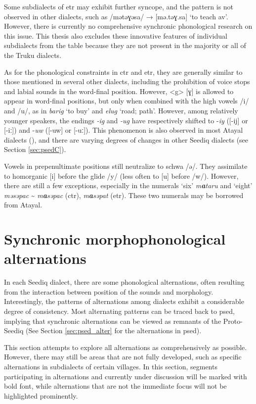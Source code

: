 Some subdialects of \acl{etr} may exhibit further syncope, and the pattern is not observed in other dialects, such as /mətəɣəsa/ → [mə.təɣ.sa] `to teach \acs{av}'. However, there is currently no comprehensive synchronic phonological research on this issue. This thesis also excludes these innovative features of individual subdialects from the table because they are not present in the majority or all of the Truku dialects.

As for the phonological constraints in \acl{ctr} and \acl{etr}, they are generally similar to those mentioned in several other dialects, including the prohibition of voice stops and labial sounds in the word-final position. However, <g> [ɣ] is allowed to appear in word-final positions, but only when combined with the high vowels /i/ and /u/, as in \textit{barig} `to buy' and \textit{elug} `road; path'. However, among relatively younger speakers, the endings \textit{-ig} and \textit{-ug} have respectively shifted to -\textit{iy} ([-ij] or [-iː]) and -\textit{uw} ([-uw] or [-uː]). This phenomenon is also observed in most Atayal dialects (\cite{li1982aicage,goderich2020phd}), and there are varying degrees of changes in other Seediq dialects (see Section \ref{sec:psedC}).

Vowels in prepenultimate positions still neutralize to schwa /ə/. They assimilate to homorganic [i] before the glide /y/ (less often to [u] before /w/). However, there are still a few exceptions, especially in the numerals `six' \textit{m\textbf{a}taru} and `eight' \textit{məsəpac} \~{} \textit{m\textbf{a}səpac} (\acs{ctr}), \textit{m\textbf{a}səpat} (\acs{etr}). These two numerals may be borrowed from Atayal.

\section{Synchronic morphophonological alternations} \label{sec:3.2}

In each Seediq dialect, there are some phonological alternations, often resulting from the interaction between position of the sounds and morphology. Interestingly, the patterns of alternations among dialects exhibit a considerable degree of consistency. Most alternating patterns can be traced back to \acl{psed}, implying that synchronic alternations can be viewed as remnants of the Proto-Seediq (See Section \ref{sec:psed_alter} for the alternations in \acl{psed}).

This section attempts to explore all alternations as comprehensively as possible. However, there may still be areas that are not fully developed, such as specific alternations in subdialects of certain villages. In this section, segments participating in alternations and currently under discussion will be marked with bold font, while alternations that are not the immediate focus will not be highlighted prominently. 

